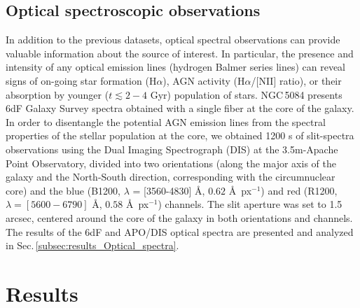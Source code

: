 \documentclass[modern]{CORE-AAS/aastex631}
\begin{document}
\subsection{Optical spectroscopic observations} \label{subsec:data_optical_spectra}
In addition to the previous datasets, optical spectral observations can provide valuable information about the source of interest. In particular, the presence and intensity of any optical emission lines (hydrogen Balmer series lines) can reveal signs of on-going star formation (H$\alpha$), AGN activity (H$\alpha$/[NII] ratio), or their absorption by younger ($t\lesssim 2-4$ Gyr) population of stars. 
NGC\,5084 presents 6dF Galaxy Survey spectra \citep{jones+2004mnras355_747,jones+2009mnras399_683} obtained with a single fiber at the core of the galaxy. In order to disentangle the potential AGN emission lines from the spectral properties of the stellar population at the core, we obtained 1200 s of slit-spectra observations using the Dual Imaging Spectrograph (DIS) at the 3.5m-Apache Point Observatory, divided into two orientations (along the major axis of the galaxy and the North-South direction, corresponding with the circumnuclear core) and the blue (B1200, $\lambda$ = [3560-4830] \AA, $0.62$ \AA\ px$^{-1}$) and red (R1200, $\lambda = [5600-6790]$ \AA, $0.58$ \AA\ px$^{-1}$) channels. The slit aperture was set to 1.5 arcsec, centered around the core of the galaxy in both orientations and channels. The results of the 6dF and APO/DIS optical spectra are presented and analyzed in Sec.\,\ref{subsec:results_Optical_spectra}.
\section{Results} \label{sec:results}
\end{document}
